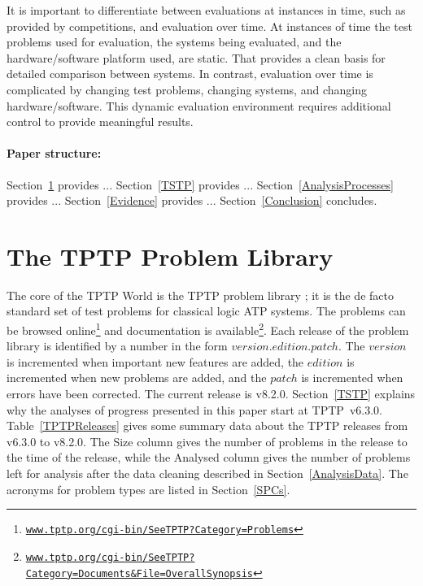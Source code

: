 \documentclass[runningheads]{llncs}
\begin{document}
It is important to differentiate between evaluations at instances in time, such as provided by
competitions, and evaluation over time.
At instances of time the test problems used for evaluation, the systems being evaluated, and
the hardware/software platform used, are static.
That provides a clean basis for detailed comparison between systems.
In contrast, evaluation over time is complicated by changing test problems, changing systems,
and changing hardware/software.
This dynamic evaluation environment requires additional control to provide meaningful results.

\paragraph{Paper structure:}
Section~\ref{TPTP} provides ...
Section~\ref{TSTP} provides ...
Section~\ref{AnalysisProcesses} provides ...
Section~\ref{Evidence} provides ...
Section~\ref{Conclusion} concludes. 

\section{The TPTP Problem Library}
\label{TPTP}

The core of the TPTP World is the TPTP problem library \cite{Sut09}; it is the de facto standard 
set of test problems for classical logic ATP systems.
The problems can be browsed online\footnote{%
\href{https://www.tptp.org/cgi-bin/SeeTPTP?Category=Problems}
{\tt www.tptp.org/cgi-bin/SeeTPTP?Category=Problems}}
and documentation is available\footnote{%
\href{https://www.tptp.org/cgi-bin/SeeTPTP?Category=Documents}
{\tt www.tptp.org/cgi-bin/SeeTPTP?Category=Documents\&File=OverallSynopsis}}.
Each release of the problem library is identified by a number in the form 
$version$.$edition$.$patch$.
The $version$ is incremented when important new features are added,
the $edition$ is incremented when new problems are added, and
the $patch$ is incremented when errors have been corrected.
The current release is v8.2.0.
Section~\ref{TSTP} explains why the analyses of progress presented in this paper start at
TPTP~v6.3.0.
Table~\ref{TPTPReleases} gives some summary data about the TPTP releases from v6.3.0 to v8.2.0.
The Size column gives the number of problems in the release to the time of the release, while
the Analysed column gives the number of problems left for analysis after the data cleaning 
described in Section~\ref{AnalysisData}.
The acronyms for problem types are listed in Section~\ref{SPCs}.
\end{document}
